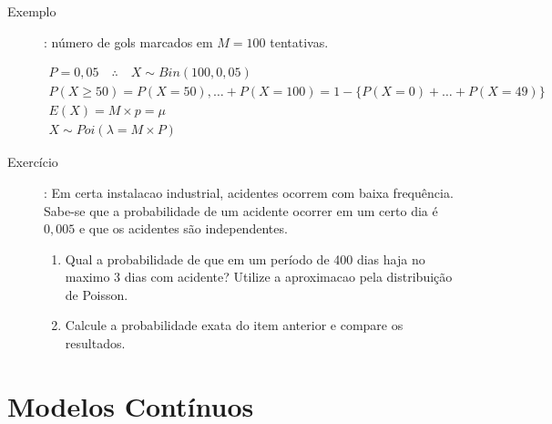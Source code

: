 \begin{description}
      \item [Exemplo]: número de gols marcados em $M=100$ tentativas.

    \begin{align*}
      P=0,05 \quad \therefore \quad  X \mathtt{\sim} Bin(100, 0,05) \\
      P(X \ge 50)=P(X=50), \ldots + P(X=100)= 1- \{P(X=0)+\ldots+P(X=49) \}\\
      E(X)=M \times p = \mu\\
      X \mathtt{\sim}Poi(\lambda= M \times P)
    \end{align*}

  \item[Exercício]: Em certa instalacao industrial, acidentes ocorrem com baixa frequência. Sabe-se que 
    a probabilidade de um acidente ocorrer em um certo dia é $0,005$ e que os acidentes são independentes.
    
    \begin{enumerate}[label=(\alph*)]
      \item Qual a probabilidade de que em um período de 400 dias haja no maximo 3 dias com acidente?
      Utilize a aproximacao pela distribuição de Poisson.
    \item Calcule a probabilidade exata do item anterior e compare os resultados.
   \end{enumerate}
   \end{description}
   \section{Modelos Contínuos}
